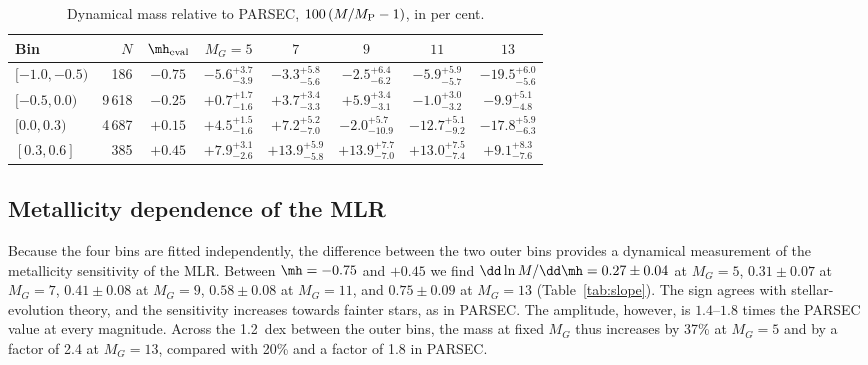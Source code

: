 \begin{table}
\caption{Dynamical mass relative to PARSEC, $100\,(M/M_{\rm P}-1)$, in
per cent.}
\label{tab:residuals}
\centering
\begin{tabular}{@{}lrcccccc@{}}
\toprule
Bin & $N$ & $\mh_{\rm eval}$ & $M_G=5$ & $7$ & $9$ & $11$ & $13$ \\
\midrule
$[-1.0,-0.5)$ & 186 & $-0.75$ &
 $-5.6^{+3.7}_{-3.9}$ & $-3.3^{+5.8}_{-5.6}$ & $-2.5^{+6.4}_{-6.2}$ &
 $-5.9^{+5.9}_{-5.7}$ & $-19.5^{+6.0}_{-5.6}$ \\
$[-0.5,0.0)$ & 9\,618 & $-0.25$ &
 $+0.7^{+1.7}_{-1.6}$ & $+3.7^{+3.4}_{-3.3}$ & $+5.9^{+3.4}_{-3.1}$ &
 $-1.0^{+3.0}_{-3.2}$ & $-9.9^{+5.1}_{-4.8}$ \\
$[0.0,0.3)$ & 4\,687 & $+0.15$ &
 $+4.5^{+1.5}_{-1.6}$ & $+7.2^{+5.2}_{-7.0}$ & $-2.0^{+5.7}_{-10.9}$ &
 $-12.7^{+5.1}_{-9.2}$ & $-17.8^{+5.9}_{-6.3}$ \\
$[0.3,0.6]$ & 385 & $+0.45$ &
 $+7.9^{+3.1}_{-2.6}$ & $+13.9^{+5.9}_{-5.8}$ & $+13.9^{+7.7}_{-7.0}$ &
 $+13.0^{+7.5}_{-7.4}$ & $+9.1^{+8.3}_{-7.6}$ \\
\bottomrule
\end{tabular}
\end{table}

\subsection{Metallicity dependence of the MLR}
\label{sec:slope}

Because the four bins are fitted independently, the difference between the
two outer bins provides a dynamical measurement of the metallicity
sensitivity of the MLR.  Between $\mh=-0.75$ and $+0.45$ we find
$\dd\ln M/\dd\mh=0.27\pm0.04$ at $M_G=5$, $0.31\pm0.07$ at $M_G=7$,
$0.41\pm0.08$ at $M_G=9$, $0.58\pm0.08$ at $M_G=11$, and $0.75\pm0.09$ at
$M_G=13$ (Table~\ref{tab:slope}).  The sign agrees with stellar-evolution
theory, and the sensitivity increases towards fainter stars, as in PARSEC.
The amplitude, however, is $1.4$--$1.8$ times the PARSEC value at every
magnitude.  Across the 1.2~dex between the outer bins, the mass at fixed
$M_G$ thus increases by 37\% at $M_G=5$ and by a factor of 2.4 at
$M_G=13$, compared with 20\% and a factor of 1.8 in PARSEC.

